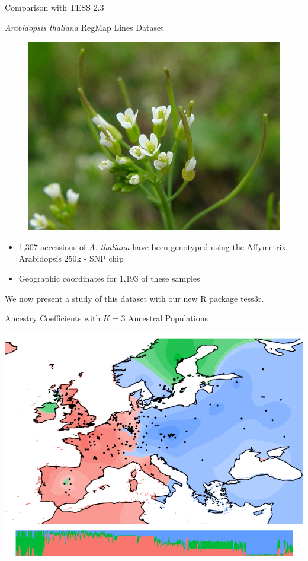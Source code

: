 \documentclass{beamer}\usepackage[]{graphicx}\usepackage[]{color}
\begin{document}
\begin{frame}{Comparison with TESS 2.3 }
\end{frame}

\begin{frame}{\emph{Arabidopsis thaliana} RegMap Lines Dataset}

\begin{figure}[H]
   \includegraphics[width=0.45\linewidth]{a_thaliana.jpg}
  \label{fig:ma_fig}

\end{figure}

\begin{itemize}
\item 1,307 accessions of \emph{A. thaliana} have been genotyped using the
  Affymetrix Arabidopsis 250k - SNP chip~\citep{horton2012genome}
  \item Geographic coordinates for 1,193 of these samples~\citep{anastasio2011source}
\end{itemize}

We now present a study of this dataset with our new R package \alert{tess3r}.

\end{frame}


\begin{frame}{Ancestry Coefficients with $K = 3$ Ancestral Populations}
\begin{center}
\includegraphics[width=0.9\linewidth]{Q_K3.pdf}
\end{center}
\end{frame}
\end{document}
